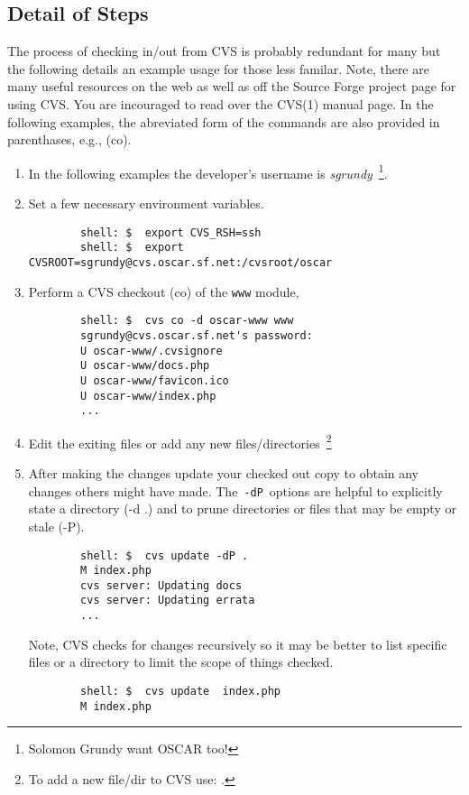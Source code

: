 
\subsection{Detail of Steps}

The process of checking in/out from CVS is probably redundant for many but
the following details an example usage for those less familar.  Note, there
are many useful resources on the web as well as off the Source Forge
project page for using CVS.  You are incouraged to read over the CVS(1)
manual page.   In the following examples, the abreviated form of the
 commands are also provided in parenthases, e.g., 
(co).

\begin{enumerate}
	\item In the following examples the developer's username is
	\emph{sgrundy}~\footnote{Solomon Grundy want OSCAR too!}.

	\item Set a few necessary environment variables.
	\begin{verbatim}
		shell: $  export CVS_RSH=ssh
		shell: $  export CVSROOT=sgrundy@cvs.oscar.sf.net:/cvsroot/oscar
	\end{verbatim}

	\item Perform a CVS checkout (co) of the {\tt www} module,
	\begin{verbatim}
		shell: $  cvs co -d oscar-www www
		sgrundy@cvs.oscar.sf.net's password: 
		U oscar-www/.cvsignore
		U oscar-www/docs.php
		U oscar-www/favicon.ico
		U oscar-www/index.php
		...
	\end{verbatim}

	\item Edit the exiting files or add any new
	files/directories~\footnote{To add a new file/dir to CVS use: .}

	\item After making the changes update your checked out copy to obtain
	any changes others might have made.  The~{\tt -dP}~options are helpful
	to explicitly state a directory (-d  .) and to prune directories or
	files that may be empty or stale (-P).
	\begin{verbatim}
		shell: $  cvs update -dP .
		M index.php
		cvs server: Updating docs
		cvs server: Updating errata
		...
	\end{verbatim}
	Note, CVS checks for changes recursively so it may be better to list
	specific files or a directory to limit the scope of things checked.  
	\begin{verbatim}
		shell: $  cvs update  index.php
		M index.php
	\end{verbatim}


\end{enumerate}
